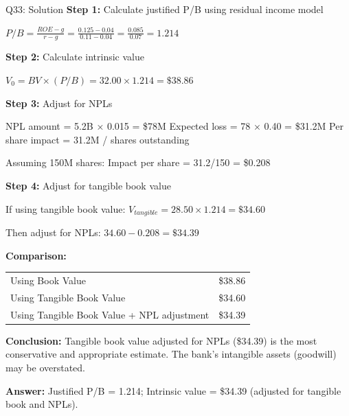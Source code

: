 \documentclass{beamer}
\renewcommand{\scriptsize}{\fontsize{6pt}{7pt}\selectfont}
\begin{document}
	\begin{frame}{Q33: Solution}
		\scriptsize
		\textbf{Step 1:} Calculate justified P/B using residual income model
		
		$P/B = \frac{ROE - g}{r - g} = \frac{0.125 - 0.04}{0.11 - 0.04} = \frac{0.085}{0.07} = 1.214$
		
		\vspace{2pt}
		\textbf{Step 2:} Calculate intrinsic value
		
		$V_0 = BV \times (P/B) = 32.00 \times 1.214 = \$38.86$
		
		\vspace{2pt}
		\textbf{Step 3:} Adjust for NPLs
		
		NPL amount = 5.2B × 0.015 = \$78M
		Expected loss = 78 × 0.40 = \$31.2M
		Per share impact = 31.2M / shares outstanding
		
		Assuming 150M shares: Impact per share = 31.2/150 = \$0.208
		
		\vspace{2pt}
		\textbf{Step 4:} Adjust for tangible book value
		
		If using tangible book value: $V_{tangible} = 28.50 \times 1.214 = \$34.60$
		
		Then adjust for NPLs: $34.60 - 0.208 = \$34.39$
		
		\vspace{2pt}
		\textbf{Comparison:}
		
		\begin{tabular}{lr}
			Using Book Value & \$38.86 \\
			Using Tangible Book Value & \$34.60 \\
			Using Tangible Book Value + NPL adjustment & \$34.39 \\
		\end{tabular}
		
		\vspace{2pt}
		\textbf{Conclusion:} Tangible book value adjusted for NPLs (\$34.39) is the most conservative and appropriate estimate. The bank's intangible assets (goodwill) may be overstated.
		
		\textbf{Answer:} Justified P/B = 1.214; Intrinsic value = \$34.39 (adjusted for tangible book and NPLs).
	\end{frame}
	
\end{document}
